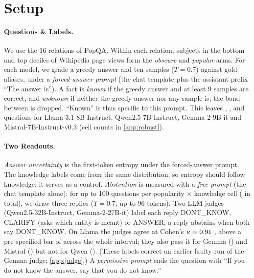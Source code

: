 \documentclass{article}
\begin{document}
\section{Setup}
\label{sec:setup}

\paragraph{Questions \& Labels.} We use the 16 relations of PopQA. Within each relation, subjects in the bottom and top deciles of Wikipedia page views form the \emph{obscure} and \emph{popular} arms. For each model, we grade a greedy answer and ten samples ($T=0.7$) against gold aliases, under a \emph{forced-answer prompt} (the chat template plus the assistant prefix ``The answer is''). A fact is \emph{known} if the greedy answer and at least 9 samples are correct, and \emph{unknown} if neither the greedy answer nor any sample is; the band between is dropped. ``Known'' is thus specific to this prompt. This leaves \faLlamaN, \faQwenN, \faGemmaN{} and \faMistralN{} questions for Llama-3.1-8B-Instruct, Qwen2.5-7B-Instruct, Gemma-2-9B-it and Mistral-7B-Instruct-v0.3 \citep{llama3,qwen25,gemma2,mistral7b} (cell counts in \cref{app:robust}).

\paragraph{Two Readouts.} \emph{Answer uncertainty} is the first-token entropy under the forced-answer prompt. The knowledge labels come from the same distribution, so entropy should follow knowledge; it serves as a control. \emph{Abstention} is measured with a \emph{free prompt} (the chat template alone): for up to 100 questions per popularity $\times$ knowledge cell (\hmLlamaItems{} in total), we draw three replies ($T=0.7$, up to 96 tokens). Two LLM judges (Qwen2.5-32B-Instruct, Gemma-2-27B-it) label each reply DONT\_KNOW, CLARIFY (asks which entity is meant) or ANSWER; a reply abstains when both say DONT\_KNOW. On Llama the judges agree at Cohen's $\kappa=0.91$ \lkKappaCI, above a pre-specified bar of \kappaBar{} across the whole interval; they also pass it for Gemma (\hmGemmaKappa) and Mistral (\hmMistralKappa) but not for Qwen (\hmQwenKappa). (These labels correct an earlier faulty run of the Gemma judge; \cref{app:judge}.) A \emph{permissive prompt} ends the question with ``If you do not know the answer, say that you do not know.''
\end{document}
